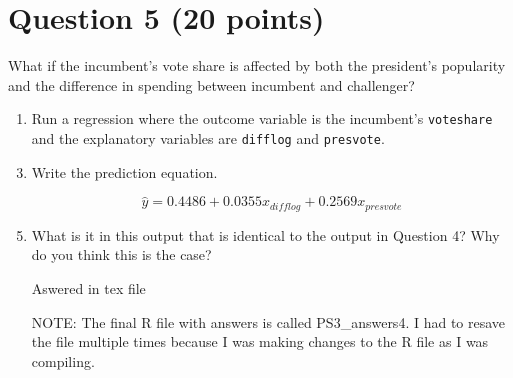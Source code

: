 \documentclass[12pt,letterpaper]{article}
\begin{document}
\section*{Question 5 (20 points)}
\noindent What if the incumbent's vote share is affected by both the president's popularity and the difference in spending between incumbent and challenger? 
	\begin{enumerate}
		\item Run a regression where the outcome variable is the incumbent's \texttt{voteshare} and the explanatory variables are \texttt{difflog} and \texttt{presvote}.	
		\item[] 
		
		\item Write the prediction equation.	
		\item[] $$\hat{y} = 0.4486 + 0.0355x_{difflog} + 0.2569x_{presvote}$$
		\item What is it in this output that is identical to the output in Question 4? Why do you think this is the case?	
		\item[] Aswered in tex file
	\end{enumerate}

\begin{itemize}
\item[NOTE:] The final R file with answers is called PS3\_answers4. I had to resave the file multiple times because I was making changes to the R file as I was compiling.
\end{itemize}

\end{document}
